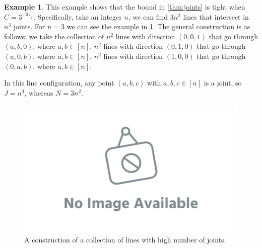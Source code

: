 \documentclass[12pt]{amsart}
\theoremstyle{definition}
\newtheorem{smpl}[thm]{Example}
\begin{document}
\begin{smpl}
This example shows that the bound in \cref{thm:joints} is tight when $C = 3^{-3/_2}$.
Specifically, take an integer $n$, we can find $3n^2$ lines that intersect in $n^3$ joints. 
For $n=3$ we can see the example in \cref{fig:joints}.
The general construction is as follows: we take the collection of $n^2$ lines with direction $(0, 0, 1)$ that go through $(a, b, 0)$, where $a, b\in [n]$, $n^2$ lines with direction $(0, 1, 0)$ that go through $(a, 0, b)$, where $a, b\in [n]$, $n^2$ lines with direction $(1, 0, 0)$ that go through $(0, a, b)$, where $a, b\in [n]$.

In this line configuration, any point $(a, b, c) $ with $a, b, c \in [n]$ is a joint, so $J = n^3$, whereas $N = 3 n^2$.

\begin{figure}[h]
\includegraphics[scale=.1]{../imgs/ina.png}%
\caption{A construction of a collection of lines with high number of joints.\label{fig:joints}}
\end{figure}
\end{smpl}
\end{document}
